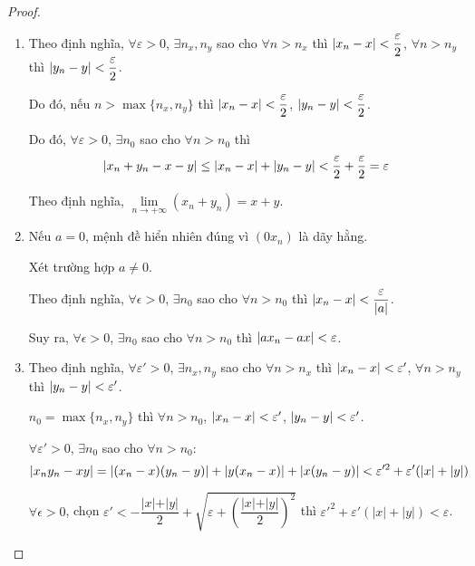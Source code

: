 \documentclass[class=analysis,crop=false]{standalone}
\begin{document}
\begin{proof}
    \begin{enumerate}[label = (\roman*)]
        \item Theo định nghĩa, $\forall\varepsilon > 0$, $\exists n_{x}, n_{y}$ sao cho $\forall n > n_{x}$ thì $\left\vert{x_{n} - x}\right\vert < \dfrac{\varepsilon}{2}$, $\forall n > n_{y}$ thì $\left\vert{y_{n} - y}\right\vert < \dfrac{\varepsilon}{2}$.
            \par Do đó, nếu $n > \max\{ n_{x}, n_{y} \}$ thì $\left\vert{x_{n} - x}\right\vert < \dfrac{\varepsilon}{2}$, $\left\vert{y_{n} - y}\right\vert < \dfrac{\varepsilon}{2}$.
            \par Do đó, $\forall\varepsilon > 0$, $\exists n_{0}$ sao cho $\forall n > n_{0}$ thì
            \[
                \left\vert{x_{n} + y_{n} - x - y}\right\vert \le \left\vert{x_{n} - x}\right\vert + \left\vert{y_{n} - y}\right\vert < \frac{\varepsilon}{2} + \frac{\varepsilon}{2} = \varepsilon
            \]
            \par Theo định nghĩa, $\lim\limits_{n\to+\infty}(x_{n} + y_{n}) = x + y$.
        \item Nếu $a = 0$, mệnh đề hiển nhiên đúng vì $(0x_{n})$ là dãy hằng.
            \par Xét trường hợp $a\ne 0$.
            \par Theo định nghĩa, $\forall\epsilon > 0$, $\exists n_{0}$ sao cho $\forall n > n_{0}$ thì $\left\vert{x_{n} - x}\right\vert < \dfrac{\varepsilon}{\left\vert{a}\right\vert}$.
            \par Suy ra, $\forall\epsilon > 0$, $\exists n_{0}$ sao cho $\forall n > n_{0}$ thì $\left\vert{ax_{n} - ax}\right\vert < \varepsilon$.
        \item Theo định nghĩa, $\forall\varepsilon' > 0$, $\exists n_{x}, n_{y}$ sao cho $\forall n > n_{x}$ thì $\left\vert{x_{n} - x}\right\vert < \varepsilon'$, $\forall n > n_{y}$ thì $\left\vert{y_{n} - y}\right\vert < \varepsilon'$.
            \par $n_{0} = \max\{ n_{x}, n_{y} \}$ thì $\forall n > n_{0}$, $\left\vert{x_{n} - x}\right\vert < \varepsilon'$, $\left\vert{y_{n} - y}\right\vert < \varepsilon'$.
            \par $\forall\varepsilon' > 0$, $\exists n_{0}$ sao cho $\forall n > n_{0}$:
            \[
                \left\vert{x_{n}y_{n} - xy}\right\vert = \left\vert{(x_{n} - x)(y_{n} - y)}\right\vert + \left\vert{y(x_{n} - x)}\right\vert + \left\vert{x(y_{n} - y)}\right\vert < \varepsilon'^{2} + \varepsilon'(\left\vert{x}\right\vert + \left\vert{y}\right\vert)
            \]
            \par $\forall\epsilon > 0$, chọn $\varepsilon' < -\dfrac{\vert x\vert + \vert y\vert}{2} + \sqrt{\varepsilon + \left(\dfrac{\vert x\vert + \vert y\vert}{2}\right)^{2}}$ thì $\varepsilon'^{2} + \varepsilon'(|x| + |y|) < \varepsilon$.

\end{enumerate}
\end{proof}
\end{document}
